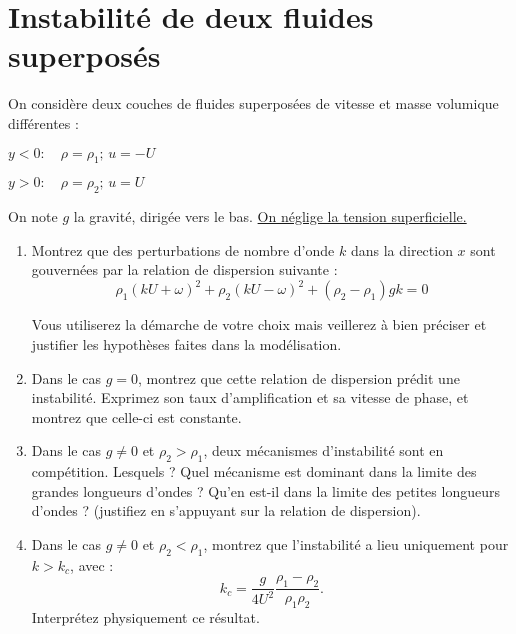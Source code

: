 \documentclass[a4paper,12pt]{article}
\begin{document}
\section*{Instabilité de deux fluides superposés}

On considère deux couches de fluides superposées de vitesse et masse volumique différentes :

$y<0 : \quad \rho = \rho_1 ; \, u = - U$ 

 $y>0 : \quad \rho = \rho_2 ; \, u = U$


On note $g$ la gravité, dirigée vers le bas. \underline{ On néglige la tension superficielle.}

\begin{enumerate}

\item Montrez que des perturbations de nombre d'onde $k$ dans la direction $x$ sont gouvernées par la relation de dispersion suivante :
\begin{equation}
\rho_1 (k U + \omega)^2 + \rho_2( kU - \omega)^2 +(\rho_2-\rho_1) g k = 0
\end{equation} 

Vous utiliserez la démarche de votre choix mais veillerez à bien préciser et justifier les hypothèses faites dans la modélisation.

\item Dans le cas $g=0$, montrez que cette relation de dispersion prédit une instabilité. Exprimez 
son taux d'amplification et sa vitesse de phase, et montrez que celle-ci est constante.

\item Dans le cas $g\ne 0$ et $\rho_2 > \rho_1$, deux mécanismes d'instabilité sont en compétition. Lesquels ? Quel mécanisme est dominant dans la limite des grandes longueurs d'ondes ? Qu'en est-il dans la limite des petites longueurs d'ondes ? (justifiez en s'appuyant sur la relation de dispersion).

\item Dans le cas  $g\ne 0$ et $\rho_2 < \rho_1$, montrez que l'instabilité a lieu uniquement pour $k>k_c$, avec :
\begin{equation}
k_c = \frac{g }{4 U^2}  \frac{\rho_1-\rho_2}{\rho_1 \rho_2}.
\end{equation} 
Interprétez physiquement ce résultat.

\end{enumerate}
\end{document}
